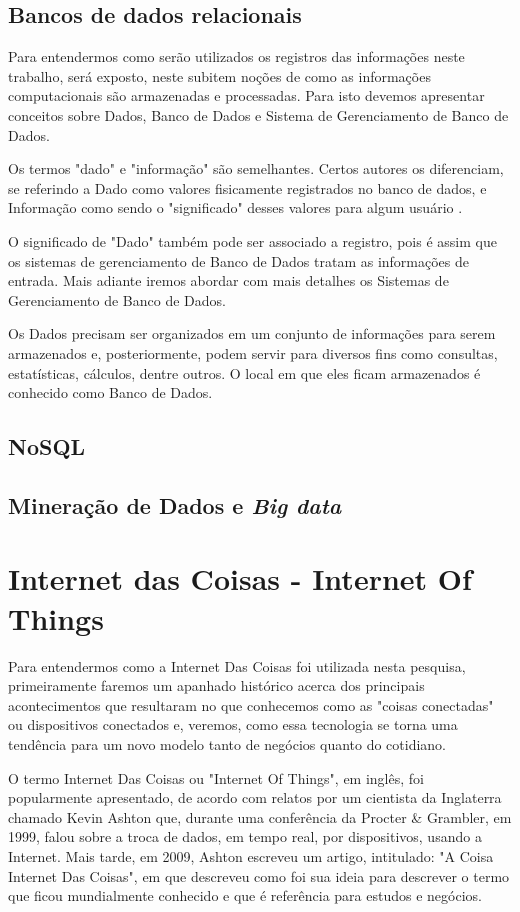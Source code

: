  
\section{Bancos de dados relacionais}
Para entendermos como serão utilizados os registros das informações neste trabalho, será exposto, neste subitem noções de como as informações computacionais são armazenadas e processadas. Para isto devemos apresentar conceitos sobre Dados, Banco de Dados e Sistema de Gerenciamento de Banco de Dados.

Os termos "dado" e "informação" são semelhantes. Certos autores os diferenciam, se referindo a Dado como valores fisicamente registrados no banco de dados, e Informação como sendo o "significado" desses valores para algum usuário \cite{C.Date}.

O significado de "Dado" também pode ser associado a registro, pois é assim que os sistemas de gerenciamento de Banco de Dados tratam as informações de entrada\cite{Kotaro-2005}. Mais adiante iremos abordar com mais detalhes os Sistemas de Gerenciamento de Banco de Dados.

Os Dados precisam ser organizados em um conjunto de informações para serem armazenados e, posteriormente, podem servir para diversos fins como consultas, estatísticas, cálculos, dentre outros. O local em que eles ficam armazenados é conhecido como Banco de Dados\cite{Kotaro-2005}.
\section {NoSQL}

\section{Mineração de Dados e \textit{Big data}}

\chapter{Internet das Coisas - Internet Of Things}

Para entendermos como a Internet Das Coisas foi utilizada nesta pesquisa, primeiramente faremos um apanhado histórico acerca dos principais acontecimentos que resultaram no que conhecemos como as "coisas conectadas" ou dispositivos conectados e, veremos, como essa tecnologia se torna uma tendência para um novo modelo tanto de negócios quanto do cotidiano.

O termo Internet Das Coisas ou "Internet Of Things", em inglês, foi popularmente apresentado, de acordo com relatos por um cientista da Inglaterra chamado Kevin Ashton que, durante uma conferência da Procter \& Grambler, em 1999, falou sobre a troca de dados, em tempo real, por dispositivos, usando a Internet. Mais tarde, em 2009, Ashton escreveu um artigo, intitulado: "A Coisa Internet Das Coisas", em que descreveu como foi sua ideia para descrever o termo que ficou mundialmente conhecido e que é referência para estudos e negócios.

